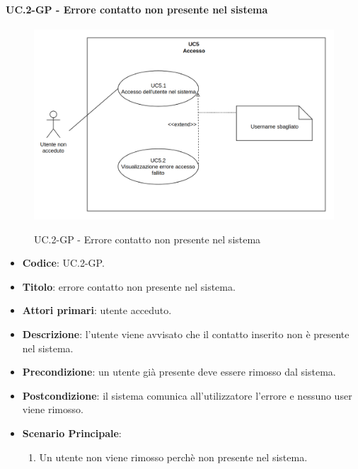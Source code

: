 				\paragraph{UC\theuccount.2-GP - Errore contatto non presente nel sistema}
						\begin{figure}[H]
							\centering
							\includegraphics[width=\columnwidth]{img/UC5.png}\\
							\caption{UC\theuccount.2-GP - Errore contatto non presente nel sistema}
						\end{figure}
						\begin{itemize}
							\item \textbf{Codice}: UC\theuccount.2-GP.
							\item \textbf{Titolo}: errore contatto non presente nel sistema.
							\item \textbf{Attori primari}: utente acceduto.
							\item \textbf{Descrizione}: l’utente viene avvisato che il contatto inserito non è presente nel sistema.
							\item \textbf{Precondizione}: un utente già presente deve essere rimosso dal sistema.
							\item \textbf{Postcondizione}: il sistema comunica all’utilizzatore l’errore e nessuno user viene rimosso.
							\item \textbf{Scenario Principale}:
							\begin{enumerate}
								\item Un utente non viene rimosso perchè non presente nel sistema.
							\end{enumerate}
						\end{itemize}